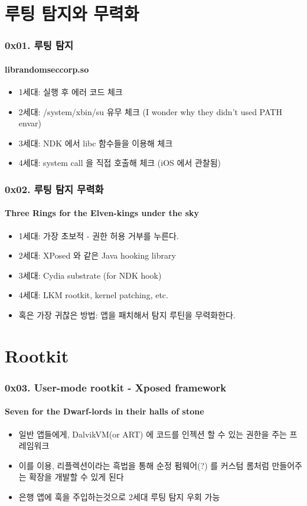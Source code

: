 \section[Section]{루팅 탐지와 무력화}
\begin{frame}
  \frametitle{0x01. 루팅 탐지}
  \framesubtitle{librandomseccorp.so}

  \begin{itemize}
  \item 1세대: 실행 후 에러 코드 체크
  \item 2세대: /system/xbin/su 유무 체크 (I wonder why they didn't used PATH envar)
  \item 3세대: NDK 에서 libc 함수들을 이용해 체크
  \item 4세대: system call 을 직접 호출해 체크 (iOS 에서 관찰됨)
  \end{itemize}
\end{frame}

\begin{frame}
  \frametitle{0x02. 루팅 탐지 무력화}
  \framesubtitle{Three Rings for the Elven-kings under the sky}

  \begin{itemize}
  \item 1세대: 가장 초보적 - 권한 허용 거부를 누른다.
  \item 2세대: XPosed 와 같은 Java hooking library
  \item 3세대: Cydia substrate (for NDK hook)
  \item 4세대: LKM rootkit, kernel patching, etc.
  \item 혹은 가장 귀찮은 방법: 앱을 패치해서 탐지 루틴을 무력화한다.
  \end{itemize}
\end{frame}

\section[Section]{Rootkit}
\begin{frame}
  \frametitle{0x03. User-mode rootkit - Xposed framework}
  \framesubtitle{Seven for the Dwarf-lords in their halls of stone}

  \begin{itemize}
  \item 일반 앱들에게, DalvikVM(or ART) 에 코드를 인젝션 할 수 있는 권한을 주는 프레임워크
  \item 이를 이용, 리플렉션이라는 흑법을 통해 순정 펌웨어(?) 를 커스텀 롬처럼 만들어주는 확장을 개발할 수 있게 된다
  \item 은행 앱에 훅을 주입하는것으로 2세대 루팅 탐지 우회 가능
  \end{itemize}
\end{frame}

